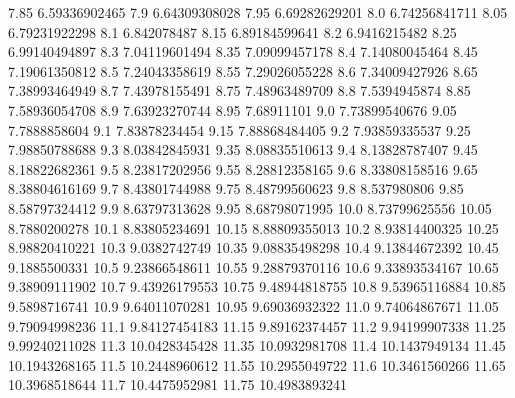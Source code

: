            7.85    6.59336902465
            7.9    6.64309308028
           7.95    6.69282629201
            8.0    6.74256841711
           8.05    6.79231922298
            8.1      6.842078487
           8.15    6.89184599641
            8.2     6.9416215482
           8.25    6.99140494897
            8.3    7.04119601494
           8.35    7.09099457178
            8.4    7.14080045464
           8.45    7.19061350812
            8.5    7.24043358619
           8.55    7.29026055228
            8.6    7.34009427926
           8.65    7.38993464949
            8.7    7.43978155491
           8.75    7.48963489709
            8.8     7.5394945874
           8.85    7.58936054708
            8.9    7.63923270744
           8.95       7.68911101
            9.0    7.73899540676
           9.05     7.7888858604
            9.1    7.83878234454
           9.15    7.88868484405
            9.2    7.93859335537
           9.25    7.98850788688
            9.3    8.03842845931
           9.35    8.08835510613
            9.4    8.13828787407
           9.45    8.18822682361
            9.5    8.23817202956
           9.55    8.28812358165
            9.6    8.33808158516
           9.65    8.38804616169
            9.7    8.43801744988
           9.75    8.48799560623
            9.8      8.537980806
           9.85    8.58797324412
            9.9    8.63797313628
           9.95    8.68798071995
           10.0    8.73799625556
          10.05     8.7880200278
           10.1    8.83805234691
          10.15    8.88809355013
           10.2    8.93814400325
          10.25    8.98820410221
           10.3     9.0382742749
          10.35    9.08835498298
           10.4    9.13844672392
          10.45     9.1885500331
           10.5    9.23866548611
          10.55    9.28879370116
           10.6    9.33893534167
          10.65    9.38909111902
           10.7    9.43926179553
          10.75    9.48944818755
           10.8    9.53965116884
          10.85     9.5898716741
           10.9    9.64011070281
          10.95    9.69036932322
           11.0    9.74064867671
          11.05    9.79094998236
           11.1    9.84127454183
          11.15    9.89162374457
           11.2    9.94199907338
          11.25    9.99240211028
           11.3    10.0428345428
          11.35    10.0932981708
           11.4    10.1437949134
          11.45    10.1943268165
           11.5    10.2448960612
          11.55    10.2955049722
           11.6    10.3461560266
          11.65    10.3968518644
           11.7    10.4475952981
          11.75    10.4983893241
